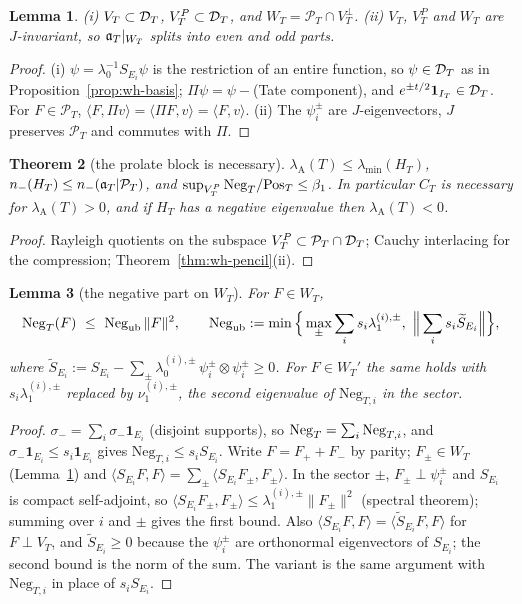 \documentclass[11pt]{amsart}
\newtheorem{theorem}{Theorem}[section]
\newtheorem{lemma}[theorem]{Lemma}
\theoremstyle{definition}
\theoremstyle{remark}
\newcommand{\PT}{\mathcal P_T}
\newcommand{\IT}{I_T}
\begin{document}
\begin{lemma}\label{lem:wh-W}
\emph{(i)} $V_T\subset\mathcal D_T$, $V_T^P\subset\mathcal D_T$, and $W_T=\PT\cap V_T^\perp$. \emph{(ii)} $V_T$, $V_T^P$ and $W_T$ are
$J$-invariant, so $\mathfrak a_T|_{W_T}$ splits into even and odd parts.
\end{lemma}
\begin{proof}
(i) $\psi=\lambda_0^{-1}S_{E_i}\psi$ is the restriction of an entire function, so $\psi\in\mathcal D_T$ as in
Proposition~\ref{prop:wh-basis}; $\Pi\psi=\psi-$(Tate component), and $e^{\pm t/2}\mathbf 1_{\IT}\in\DT$. For $F\in\PT$,
$\langle F,\Pi v\rangle=\langle\Pi F,v\rangle=\langle F,v\rangle$. (ii) The $\psi_i^\pm$ are $J$-eigenvectors, $J$ preserves $\PT$ and commutes with $\Pi$.
\end{proof}

\begin{theorem}[the prolate block is necessary]\label{thm:wh-necessary}
$\lambda_{\mathrm A}(T)\le\lambda_{\min}(H_T)$, $n_-(H_T)\le n_-(\fa|\PT)$, and $\sup_{V_T^P}\mathrm{Neg}_T/\mathrm{Pos}_T\le\beta_1$. In particular
$C_T$ is necessary for $\lambda_{\mathrm A}(T)>0$, and if $H_T$ has a negative eigenvalue then $\lambda_{\mathrm A}(T)<0$.
\end{theorem}
\begin{proof}
Rayleigh quotients on the subspace $V_T^P\subset\PT\cap\DT$; Cauchy interlacing for the compression; Theorem~\ref{thm:wh-pencil}(ii).
\end{proof}

\begin{lemma}[the negative part on $W_T$]\label{lem:wh-neg}
For $F\in W_T$,
\[
\Neg(F)\ \le\ \mathrm{Neg}_{\mathrm{ub}}\,\|F\|^2,\qquad
\mathrm{Neg}_{\mathrm{ub}}:=\min\Big\{\max_\pm\sum_is_i\lambda_1^{(i),\pm},\ \Big\|\sum_is_i\widetilde S_{E_i}\Big\|\Big\},
\]
where $\widetilde S_{E_i}:=S_{E_i}-\sum_\pm\lambda_0^{(i),\pm}\,\psi_i^\pm\otimes\psi_i^\pm\ge0$.
For $F\in W_T'$ the same holds with $s_i\lambda_1^{(i),\pm}$ replaced by $\nu_1^{(i),\pm}$, the second eigenvalue of $\mathrm{Neg}_{T,i}$ in the sector.
\end{lemma}
\begin{proof}
$\sigma_-=\sum_i\sigma_-\mathbf 1_{E_i}$ (disjoint supports), so $\mathrm{Neg}_T=\sum_i\mathrm{Neg}_{T,i}$, and $\sigma_-\mathbf 1_{E_i}\le s_i\mathbf 1_{E_i}$
gives $\mathrm{Neg}_{T,i}\le s_iS_{E_i}$. Write $F=F_++F_-$ by parity; $F_\pm\in W_T$ (Lemma~\ref{lem:wh-W}) and
$\langle S_{E_i}F,F\rangle=\sum_\pm\langle S_{E_i}F_\pm,F_\pm\rangle$. In the sector $\pm$, $F_\pm\perp\psi_i^\pm$ and $S_{E_i}$ is compact
self-adjoint, so $\langle S_{E_i}F_\pm,F_\pm\rangle\le\lambda_1^{(i),\pm}\|F_\pm\|^2$ (spectral theorem); summing over $i$ and $\pm$
gives the first bound. Also $\langle S_{E_i}F,F\rangle=\langle\widetilde S_{E_i}F,F\rangle$ for $F\perp V_T$, and $\widetilde S_{E_i}\ge0$
because the $\psi_i^\pm$ are orthonormal eigenvectors of $S_{E_i}$; the second bound is the norm of the sum. The variant is the
same argument with $\mathrm{Neg}_{T,i}$ in place of $s_iS_{E_i}$.
\end{proof}
\end{document}
